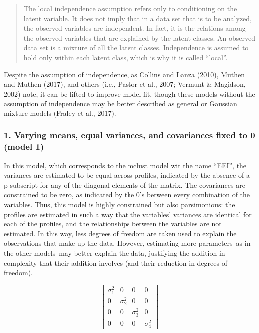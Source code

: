 \documentclass[]{msu-thesis}
\theoremstyle{definition}
\theoremstyle{definition}
\theoremstyle{definition}
\theoremstyle{remark}
\begin{document}
\begin{quote}
The local independence assumption refers only to conditioning on the
latent variable. It does not imply that in a data set that is to be
analyzed, the observed variables are independent. In fact, it is the
relations among the observed variables that are explained by the latent
classes. An observed data set is a mixture of all the latent classes.
Independence is assumed to hold only within each latent class, which is
why it is called ``local''.
\end{quote}

Despite the assumption of independence, as Collins and Lanza (2010),
Muthen and Muthen (2017), and others (i.e., Pastor et al., 2007; Vermunt
\& Magidson, 2002) note, it can be lifted to improve model fit, though
these models without the assumption of independence may be better
described as general or Gaussian mixture models (Fraley et al., 2017).

\subsubsection{1. Varying means, equal variances, and covariances fixed
to 0 (model
1)}\label{varying-means-equal-variances-and-covariances-fixed-to-0-model-1}

In this model, which corresponds to the mclust model wit the name
``EEI'', the variances are estimated to be equal across profiles,
indicated by the absence of a p subscript for any of the diagonal
elements of the matrix. The covariances are constrained to be zero, as
indicated by the 0's between every combination of the variables. Thus,
this model is highly constrained but also parsimonious: the profiles are
estimated in such a way that the variables' variances are identical for
each of the profiles, and the relationships between the variables are
not estimated. In this way, less degrees of freedom are taken used to
explain the observations that make up the data. However, estimating more
parameters--as in the other models--may better explain the data,
justifying the addition in complexity that their addition involves (and
their reduction in degrees of freedom).

\[
\left[ \begin{matrix} { \sigma  }_{ 1 }^{ 2 } & 0 & 0 & 0 \\ 0 & { \sigma  }_{ 2 }^{ 2 } & 0 & 0 \\ 0 & 0 & { \sigma  }_{ 3 }^{ 2 } & 0 \\ 0 & 0 & 0 & { \sigma  }_{ 4 }^{ 2 } \end{matrix} \right] 
\]
\end{document}
